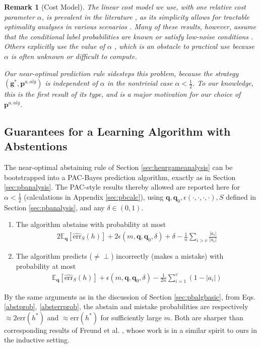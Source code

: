 \documentclass{article}[12pt]
\theoremstyle{named}
\newtheorem{nremark}{Remark}
\newcommand{\vg}{\mathbf{g}}    %
\newcommand{\vp}{\mathbf{p}}
\newcommand{\vq}{\mathbf{q}}
\newcommand{\evp}[2]{\mathbb{E}_{#2} \left[#1\right]} %
\newcommand{\abs}[1]{\left| #1 \right|}
\newcommand{\err}[1]{\mbox{err}\left(#1\right)}
\newcommand{\emperr}[2]{\widehat{\mbox{err}}_{#2} \left(#1\right)}
\newcommand*{\qedinpw}{\hfill\ensuremath{\square}} %
\newcommand{\lrp}[1]{\left(#1\right)}
\begin{document}
\begin{nremark}[Cost Model]
The linear cost model we use, with one relative cost parameter $\alpha$, 
is prevalent in the literature \cite{T00, WY11}, 
as its simplicity allows for tractable optimality analyses in various scenarios \cite{BW08, C70, YW10}. 
Many of these results, however, assume that the conditional label probabilities are known 
or satisfy low-noise conditions \cite{BW08}.
Others explicitly use the value of $\alpha$ \cite{C70}, 
which is an obstacle to practical use because $\alpha$ is often unknown or difficult to compute. 

Our near-optimal prediction rule sidesteps this problem, because the strategy $(\vg^*, \vp^{a, alg})$ 
is independent of $\alpha$ in the nontrivial case $\alpha < \frac{1}{2}$. 
To our knowledge, this is the first result of its type, and is a major motivation for our choice of $\vp^{a, alg}$.
\end{nremark}



\subsection{Guarantees for a Learning Algorithm with Abstentions}
The near-optimal abstaining rule of Section \ref{sec:heurgameanalysis} can be bootstrapped into 
a PAC-Bayes prediction algorithm, exactly as in Section \ref{sec:pbanalysis}. 
The PAC-style results thereby allowed are reported here for $\alpha < \frac{1}{2}$ 
(calculations in Appendix \ref{sec:pbcalc}), 
using $\vq, \vq_0, \epsilon(\cdot,\cdot,\cdot,\cdot), S$ defined in Section \ref{sec:pbanalysis}, 
and any $\delta \in (0,1)$.
\begin{enumerate}
\item
The algorithm abstains with probability at most 
\begin{align}
\label{abstprob}
2 \evp{\emperr{h}{S}}{\vq} + 2 \epsilon (m, \vq, \vq_0, \delta) + \delta - \frac{1}{n} \sum_{i > v} \frac{\abs{a_i}}{\abs{a_v}}
\end{align}
\item
The algorithm predicts ($\neq \perp$) incorrectly (makes a mistake) with probability at most 
\begin{align}
\label{absterrprob}
\evp{\emperr{h}{S}}{\vq} + \epsilon (m, \vq, \vq_0, \delta) - \frac{1}{2n} \sum_{i=1}^v \lrp{1 - \abs{a_i}}
\end{align}
\end{enumerate}
By the same arguments as in the discussion of Section \ref{sec:pbalgbasic}, 
from Eqs. \eqref{abstprob}, \eqref{absterrprob},
the abstain and mistake probabilities are respectively 
$\approx 2 \err{h^*}$ and $\approx \err{h^*}$ for sufficiently large $m$.
Both are sharper than corresponding results of Freund et al. \cite{FMS04}, 
whose work is in a similar spirit to ours in the inductive setting. 
\end{document}
